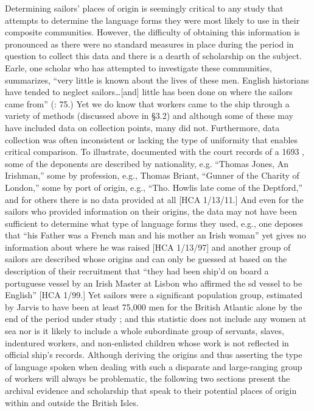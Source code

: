   Determining sailors’ places of origin is seemingly critical to any study that attempts to determine the language forms they were most likely to use in their composite communities. However, the difficulty of obtaining this information is pronounced as there were no standard measures in place during the period in question to collect this data and there is a dearth of scholarship on the subject. Earle, one scholar who has attempted to investigate these communities, summarizes, “very little is known about the lives of these men. English historians have tended to neglect sailors…[and] little has been done on where the sailors came from” (\citeyear*{Earle1993}: 75.) Yet we do know that workers came to the ship through a variety of methods (discussed above in §3.2) and although some of these may have included data on collection points, many did not. Furthermore, data collection was often inconsistent or lacking the type of uniformity that enables critical comparison. To illustrate, documented with the court records of a 1693 , some of the deponents are described by nationality, e.g. “Thomas Jones, An Irishman,” some by profession, e.g., Thomas Briant, “Gunner of the Charity of London,” some by port of origin, e.g., “Tho. Howlis late come of the Deptford,” and for others there is no data provided at all [HCA 1/13/11.] And even for the sailors who provided information on their origins, the data may not have been sufficient to determine what type of language forms they used, e.g., one  deposes that “his Father was a French man and his mother an Irish woman” yet gives no information about where he was raised [HCA 1/13/97] and another group of sailors are described whose origins and  can only be guessed at based on the description of their recruitment that “they had been ship’d on board a portuguese vessel by an Irish Master at Lisbon who affirmed the sd vessel to be English” [HCA 1/99.] Yet sailors were a significant population group, estimated by Jarvis to have been at least 75,000 men for the British Atlantic alone by the end of the period under study \citep[252]{Jarvis2010}; and this statistic does not include any women at sea nor is it likely to include a whole subordinate group of servants, slaves, indentured workers, and non-enlisted children whose work is not reflected in official ship’s records. Although deriving the origins and thus asserting the type of language spoken when dealing with such a disparate and large-ranging group of workers will always be problematic, the following two sections present the archival evidence and scholarship that speak to their potential places of origin within and outside the British Isles.


